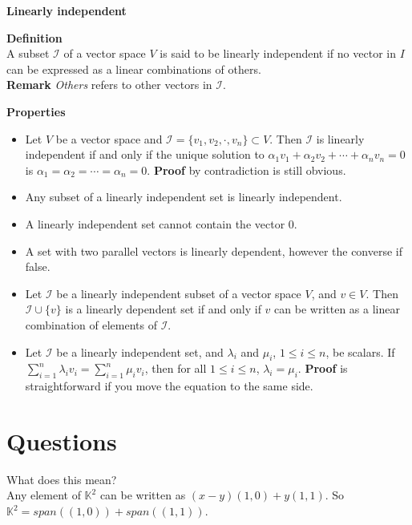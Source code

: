 \documentclass{article}
\begin{document}
\newpage

\begin{framed}

    \textbf{Linearly independent}

    \begin{framed}
        \textbf{Definition}\\
        A subset $\mathcal{I}$ of a vector space $V$ is said to be linearly independent if no vector in $I$ can be expressed as a linear combinations of others.\\
        \textbf{Remark} \textit{Others} refers to other vectors in $\mathcal{I}$.
    \end{framed}

    \begin{framed}
        \textbf{Properties}
        \begin{itemize}
            \item Let $V$ be a vector space and $\mathcal{I}=\{v_{1},v_{2},\cdot,v_{n}\}\subset V$. Then $\mathcal{I}$ is linearly independent if and only if the unique solution to $\alpha _{1}v_{1}+\alpha _{2}v_{2}+\cdots +\alpha _{n}v_{n}=0$ is $\alpha _{1}=\alpha _{2}=\cdots =\alpha _{n}=0$. \textbf{Proof} by contradiction is still obvious.
            \item Any subset of a linearly independent set is linearly independent.
            \item A linearly independent set cannot contain the vector $0$.
            \item A set with two parallel vectors is linearly dependent, however the converse if false.
            \item Let $\mathcal{I}$ be a linearly independent subset of a vector space $V$, and $v\in V$. Then $\mathcal{I}\cup \{v\}$ is a linearly dependent set if and only if $v$ can be written as a linear combination of elements of $\mathcal{I}$.
            \item Let $\mathcal{I}$ be a linearly independent set, and $\lambda _{i}$ and $\mu _{i}$, $1\leq i\leq n$, be scalars. If $\sum_{i=1}^{n}\lambda _{i}v_{i}=\sum _{i=1}^{n}\mu _{i}v_{i}$, then for all $1\leq i\leq n$, $\lambda _{i}=\mu _{i}$. \textbf{Proof} is straightforward if you move the equation to the same side.
        \end{itemize}
    \end{framed}

\end{framed}

\newpage

\section{Questions}

\begin{framed}
    What does this mean?\\
    Any element of $\mathbb{K}^{2}$ can be written as $(x-y)(1,0) + y(1,1)$. So $\mathbb{K}^{2}=span((1,0))+span((1,1))$.
\end{framed}
\end{document}
